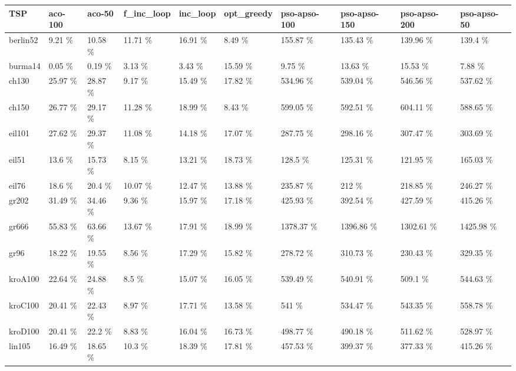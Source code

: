 \documentclass[conference]{IEEEtran}
\begin{document}
    \begin{table}[h]
	    \centering
	    \begin{adjustbox}{width=\columnwidth}
	    \begin{tabular}{ | l | l | l | l | l | l | l | l | l | l | }
	         \hline
   TSP & aco-100 & aco-50 & f\_inc\_loop & inc\_loop & opt\_greedy & pso-apso-100 & pso-apso-150 & pso-apso-200 & pso-apso-50  \\ \hline\hline
berlin52 & 9.21 \% & 10.58 \% & 11.71 \% & 16.91 \% & 8.49 \% & 155.87 \% & 135.43 \% & 139.96 \% & 139.4 \%  \\ \hline
burma14 & 0.05 \% & 0.19 \% & 3.13 \% & 3.43 \% & 15.59 \% & 9.75 \% & 13.63 \% & 15.53 \% & 7.88 \%  \\ \hline
ch130 & 25.97 \% & 28.87 \% & 9.17 \% & 15.49 \% & 17.82 \% & 534.96 \% & 539.04 \% & 546.56 \% & 537.62 \%  \\ \hline
ch150 & 26.77 \% & 29.17 \% & 11.28 \% & 18.99 \% & 8.43 \% & 599.05 \% & 592.51 \% & 604.11 \% & 588.65 \%  \\ \hline
eil101 & 27.62 \% & 29.37 \% & 11.08 \% & 14.18 \% & 17.07 \% & 287.75 \% & 298.16 \% & 307.47 \% & 303.69 \%   \\ \hline
eil51 & 13.6 \% & 15.73 \% & 8.15 \% & 13.21 \% & 18.73 \% & 128.5 \% & 125.31 \% & 121.95 \% & 165.03 \%   \\ \hline
eil76 & 18.6 \% & 20.4 \% & 10.07 \% & 12.47 \% & 13.88 \% & 235.87 \% & 212 \% & 218.85 \% & 246.27 \%   \\ \hline
gr202 & 31.49 \% & 34.46 \% & 9.36 \% & 15.97 \% & 17.18 \% & 425.93 \% & 392.54 \% & 427.59 \% & 415.26 \%   \\ \hline
gr666 & 55.83 \% & 63.66 \% & 13.67 \% & 17.91 \% & 18.99 \% & 1378.37 \% & 1396.86 \% & 1302.61 \% & 1425.98 \%   \\ \hline
gr96 & 18.22 \% & 19.55 \% & 8.56 \% & 17.29 \% & 15.82 \% & 278.72 \% & 310.73 \% & 230.43 \% & 329.35 \%   \\ \hline
kroA100 & 22.64 \% & 24.88 \% & 8.5 \% & 15.07 \% & 16.05 \% & 539.49 \% & 540.91 \% & 509.1 \% & 544.63 \%   \\ \hline
kroC100 & 20.41 \% & 22.43 \% & 8.97 \% & 17.71 \% & 13.58 \% & 541 \% & 534.47 \% & 543.35 \% & 558.78 \%   \\ \hline
kroD100 & 20.41 \% & 22.2 \% & 8.83 \% & 16.04 \% & 16.73 \% & 498.77 \% & 490.18 \% & 511.62 \% & 528.97 \%   \\ \hline
lin105 & 16.49 \% & 18.65 \% & 10.3 \% & 18.39 \% & 17.81 \% & 457.53 \% & 399.37 \% & 377.33 \% & 415.26 \%   \\ \hline

\end{tabular}
\end{adjustbox}
\end{table}
\end{document}
